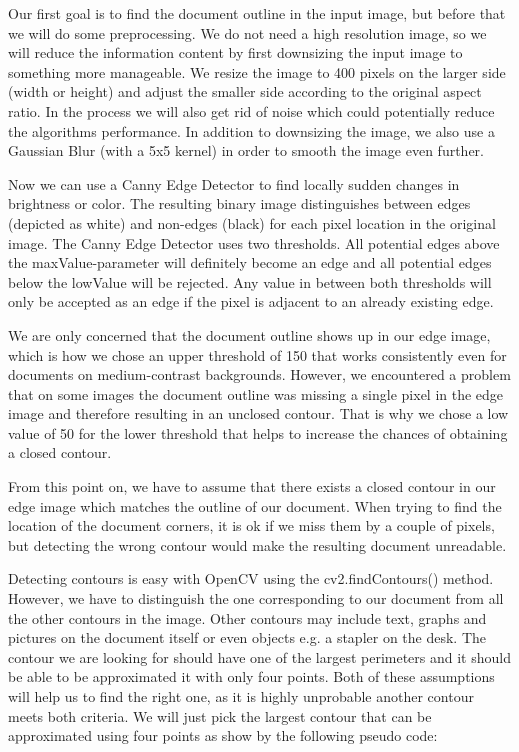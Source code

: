 \documentclass[bibliography=totoc]{scrartcl}
\begin{document}
	Our first goal is to find the document outline in the input image, but before that we will do some preprocessing.
	We do not need a high resolution image, so we will reduce the information content by first downsizing the input image to something more manageable.
	We resize the image to 400 pixels on the larger side (width or height) and adjust the smaller side according to the original aspect ratio.
	In the process we will also get rid of noise which could potentially reduce the algorithms performance.
	In addition to downsizing the image, we also use a Gaussian Blur (with a 5x5 kernel) in order to smooth the image even further.

	Now we can use a Canny Edge Detector to find locally sudden changes in brightness or color. 
	The resulting binary image distinguishes between edges (depicted as white) and non-edges (black) for each pixel location in the original image.
	The Canny Edge Detector uses two thresholds. 
	All potential edges above the maxValue-parameter will definitely become an edge and all potential edges below the lowValue will be rejected.
	Any value in between both thresholds will only be accepted as an edge if the pixel is adjacent to an already existing edge. \cite{Canny}
	
	We are only concerned that the document outline shows up in our edge image, which is how we chose an upper threshold of 150 that works consistently even for documents on medium-contrast backgrounds. 
	However, we encountered a problem that on some images the document outline was missing a single pixel in the edge image and therefore resulting in an unclosed contour.
	That is why we chose a low value of 50 for the lower threshold that helps to increase the chances of obtaining a closed contour.
	
	From this point on, we have to assume that there exists a closed contour in our edge image which matches the outline of our document. 
	When trying to find the location of the document corners, it is ok if we miss them by a couple of pixels, but detecting the wrong contour would make the resulting document unreadable.

	Detecting contours is easy with OpenCV using the cv2.findContours() method.
	However, we have to distinguish the one corresponding to our document from all the other contours in the image.
	Other contours may include text, graphs and pictures on the document itself or even objects e.g. a stapler on the desk. 
	The contour we are looking for should have one of the largest perimeters and it should be able to be approximated it with only four points.
	Both of these assumptions will help us to find the right one, as it is highly unprobable another contour meets both criteria. 
	We will just pick the largest contour that can be approximated using four points as show by the following pseudo code:
	
\end{document}
